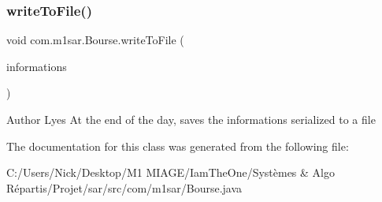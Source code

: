 \subsubsection{\texorpdfstring{write\+To\+File()}{writeToFile()}}
{\footnotesize\ttfamily void com.\+m1sar.\+Bourse.\+write\+To\+File (\begin{DoxyParamCaption}\item[{Hash\+Map}]{informations }\end{DoxyParamCaption})}

\begin{DoxyAuthor}{Author}
Lyes At the end of the day, saves the informations serialized to a file 
\end{DoxyAuthor}


The documentation for this class was generated from the following file\+:\begin{DoxyCompactItemize}
\item 
C\+:/\+Users/\+Nick/\+Desktop/\+M1 M\+I\+A\+G\+E/\+Iam\+The\+One/\+Systèmes \& Algo Répartis/\+Projet/sar/src/com/m1sar/Bourse.\+java\end{DoxyCompactItemize}
